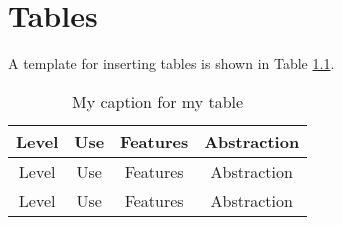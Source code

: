 









\chapter{Tables}
\label{chp:Tables}

A template for inserting tables is shown in Table \ref{tab:Table}.

\begin{table}[htdp]
\caption{My caption for my table}	\vspace{-0.2in}
\label{tab:Table}
	\begin{center}
		\begin{tabular}{|c|c|c|c|}
		\hline
		Level & Use & Features & Abstraction \\
		\hline
		Level & Use & Features & Abstraction \\
		\hline
		Level & Use & Features & Abstraction \\
		\hline
		\end{tabular}
	\end{center}
\end{table}
